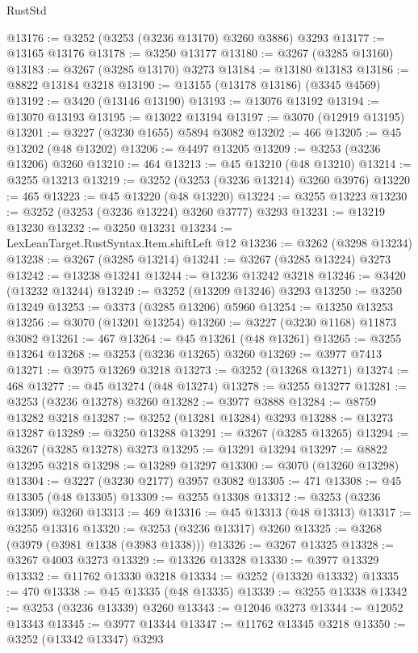 \begin{lexlean}{RustStd}
\begin{coremodule}
{\begin{coremodule}
{{{{{{{{{{{{{{{{{{{{{{{{{{{{{{{{{{{{{{{@13176 := @3252 (@3253 (@3236 @13170) @3260 @3886) @3293
@13177 := @13165 @13176
@13178 := @3250 @13177
@13180 := @3267 (@3285 @13160)
@13183 := @3267 (@3285 @13170) @3273
@13184 := @13180 @13183
@13186 := @8822 @13184 @3218
@13190 := @13155 (@13178 @13186) (@3345 @4569)
@13192 := @3420 (@13146 @13190)
@13193 := @13076 @13192
@13194 := @13070 @13193
@13195 := @13022 @13194
@13197 := @3070 (@12919 @13195)
@13201 := @3227 (@3230 @1655) @5894 @3082
@13202 := 466
@13205 := @45 @13202 (@48 @13202)
@13206 := @4497 @13205
@13209 := @3253 (@3236 @13206) @3260
@13210 := 464
@13213 := @45 @13210 (@48 @13210)
@13214 := @3255 @13213
@13219 := @3252 (@3253 (@3236 @13214) @3260 @3976)
@13220 := 465
@13223 := @45 @13220 (@48 @13220)
@13224 := @3255 @13223
@13230 := @3252 (@3253 (@3236 @13224) @3260 @3777) @3293
@13231 := @13219 @13230
@13232 := @3250 @13231
@13234 := LexLeanTarget.RustSyntax.Item.shiftLeft @12
@13236 := @3262 (@3298 @13234)
@13238 := @3267 (@3285 @13214)
@13241 := @3267 (@3285 @13224) @3273
@13242 := @13238 @13241
@13244 := @13236 @13242 @3218
@13246 := @3420 (@13232 @13244)
@13249 := @3252 (@13209 @13246) @3293
@13250 := @3250 @13249
@13253 := @3373 (@3285 @13206) @5960
@13254 := @13250 @13253
@13256 := @3070 (@13201 @13254)
@13260 := @3227 (@3230 @1168) @11873 @3082
@13261 := 467
@13264 := @45 @13261 (@48 @13261)
@13265 := @3255 @13264
@13268 := @3253 (@3236 @13265) @3260
@13269 := @3977 @7413
@13271 := @3975 @13269 @3218
@13273 := @3252 (@13268 @13271)
@13274 := 468
@13277 := @45 @13274 (@48 @13274)
@13278 := @3255 @13277
@13281 := @3253 (@3236 @13278) @3260
@13282 := @3977 @3888
@13284 := @8759 @13282 @3218
@13287 := @3252 (@13281 @13284) @3293
@13288 := @13273 @13287
@13289 := @3250 @13288
@13291 := @3267 (@3285 @13265)
@13294 := @3267 (@3285 @13278) @3273
@13295 := @13291 @13294
@13297 := @8822 @13295 @3218
@13298 := @13289 @13297
@13300 := @3070 (@13260 @13298)
@13304 := @3227 (@3230 @2177) @3957 @3082
@13305 := 471
@13308 := @45 @13305 (@48 @13305)
@13309 := @3255 @13308
@13312 := @3253 (@3236 @13309) @3260
@13313 := 469
@13316 := @45 @13313 (@48 @13313)
@13317 := @3255 @13316
@13320 := @3253 (@3236 @13317) @3260
@13325 := @3268 (@3979 (@3981 @1338 (@3983 @1338)))
@13326 := @3267 @13325
@13328 := @3267 @4003 @3273
@13329 := @13326 @13328
@13330 := @3977 @13329
@13332 := @11762 @13330 @3218
@13334 := @3252 (@13320 @13332)
@13335 := 470
@13338 := @45 @13335 (@48 @13335)
@13339 := @3255 @13338
@13342 := @3253 (@3236 @13339) @3260
@13343 := @12046 @3273
@13344 := @12052 @13343
@13345 := @3977 @13344
@13347 := @11762 @13345 @3218
@13350 := @3252 (@13342 @13347) @3293
}}}}}}}}}}}}}}}}}}}}}}}}}}}}}}}}}}}}}}}
\end{coremodule}}
\end{coremodule}
\end{lexlean}
